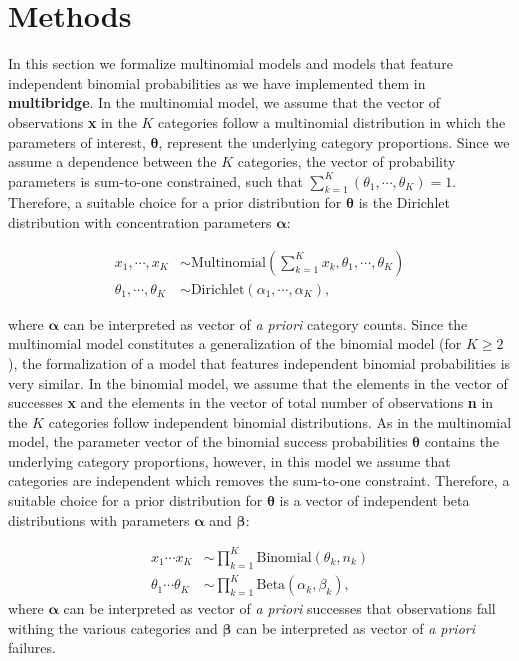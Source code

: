 \documentclass[
  english,
  man,floatsintext]{apa6}
\begin{document}
\hypertarget{methods}{%
\section{Methods}\label{methods}}

In this section we formalize multinomial models and models that feature independent binomial probabilities as we have implemented them in \textbf{multibridge}. In the multinomial model, we assume that the vector of observations \textbf{x} in the \(K\) categories follow a multinomial distribution in which the parameters of interest, \(\boldsymbol{\theta}\), represent the underlying category proportions. Since we assume a dependence between the \(K\) categories, the vector of probability parameters is sum-to-one constrained, such that \(\sum_{k = 1}^K (\theta_1, \cdots, \theta_K) = 1\). Therefore, a suitable choice for a prior distribution for \(\boldsymbol{\theta}\) is the Dirichlet distribution with concentration parameters \(\boldsymbol{\alpha}\):

\begin{align}
  x_1, \cdots, x_K &\sim \text{Multinomial}(\sum_{k = 1}^K x_k, \theta_1, \cdots, \theta_K) \\
  \theta_1, \cdots, \theta_K &\sim \text{Dirichlet}(\alpha_1, \cdots, \alpha_K),
\end{align}

where \(\boldsymbol{\alpha}\) can be interpreted as vector of \emph{a priori} category counts. Since the multinomial model constitutes a generalization of the binomial model (for \(K \geq 2\)), the formalization of a model that features independent binomial probabilities is very similar. In the binomial model, we assume that the elements in the vector of successes \textbf{x} and the elements in the vector of total number of observations \textbf{n} in the \(K\) categories follow independent binomial distributions. As in the multinomial model, the parameter vector of the binomial success probabilities \(\boldsymbol{\theta}\) contains the underlying category proportions, however, in this model we assume that categories are independent which removes the sum-to-one constraint. Therefore, a suitable choice for a prior distribution for \(\boldsymbol{\theta}\) is a vector of independent beta distributions with parameters \(\boldsymbol{\alpha}\) and \(\boldsymbol{\beta}\):

\begin{align}
  x_1 \cdots x_K & \sim \prod_{k = 1}^K \text{Binomial}(\theta_k, n_k) \\
  \theta_1 \cdots \theta_K &\sim \prod_{k = 1}^K \text{Beta}(\alpha_k, \beta_k),
\end{align}
where \(\boldsymbol{\alpha}\) can be interpreted as vector of \emph{a priori} successes that observations fall withing the various categories and \(\boldsymbol{\beta}\) can be interpreted as vector of \emph{a priori} failures.
\end{document}
